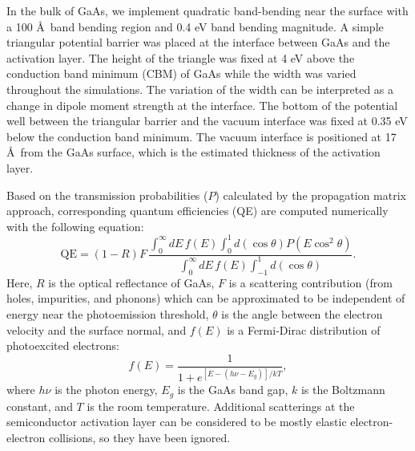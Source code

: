 In the bulk of GaAs, we implement quadratic band-bending near the surface with a 100 \AA\ band bending region and 0.4 eV band bending magnitude.\cite{karkare2013} A simple triangular potential barrier was placed at the interface between GaAs and the activation layer. The height of the triangle was fixed at 4 eV above the conduction band minimum (CBM) of GaAs\cite{vergara1999} while the width was varied throughout the simulations. The variation of the width can be interpreted as a change in dipole moment strength at the interface.
The bottom of the potential well between the triangular barrier and the vacuum interface was fixed at 0.35 eV below the conduction band minimum.\cite{uebbing1970, jin2014, bakin2015}
The vacuum interface is positioned at 17 \AA\ from the GaAs surface, which is the estimated thickness of the activation layer.

Based on the transmission probabilities ($P$) calculated by the propagation matrix approach,\cite{levi2006applied,gilmore2004elementary} corresponding quantum efficiencies (QE) are computed numerically with the following equation:
\begin{equation}
	\textrm{QE} = (1-R) F\, \frac{\int^\infty_0 dE\, f(E) \int^1_0 d(\cos\theta) P(E \cos^2 \theta)}{\int^\infty_0 dE\, f(E) \int^1_{-1} d(\cos\theta)}.
\end{equation}
Here, $R$ is the optical reflectance of GaAs, $F$ is a scattering contribution (from holes, impurities, and phonons)\cite{karkare2013} which can be approximated to be independent of energy near the photoemission threshold,\cite{dowell2009_QuantumEfficiencyThermal} $\theta$ is the angle between the electron velocity and the surface normal, and $f(E)$ is a Fermi-Dirac distribution of photoexcited electrons:
\begin{equation}
	f(E) = \frac{1}{1+e^{[E-(h\nu -E_g)]/kT}},
\end{equation}
where $h\nu$ is the photon energy, $E_g$ is the GaAs band gap, $k$ is the Boltzmann constant, and $T$ is the room temperature. Additional scatterings at the semiconductor activation layer can be considered to be mostly elastic electron-electron collisions, so they have been ignored\cite{cultrera2020_LongLifetimePolarized}.

